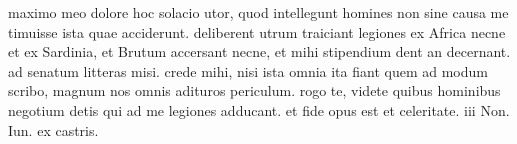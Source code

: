 


 maximo meo dolore hoc solacio utor, quod intellegunt homines non sine causa me timuisse ista quae acciderunt. deliberent utrum traiciant legiones ex Africa necne et ex Sardinia, et Brutum accersant necne, et mihi stipendium dent an decernant. ad senatum litteras misi. crede mihi, nisi ista omnia ita fiant quem ad modum scribo, magnum nos omnis adituros periculum. rogo te, videte quibus hominibus negotium detis qui ad me legiones adducant. et fide opus est et celeritate. iii Non. Iun. ex castris.
